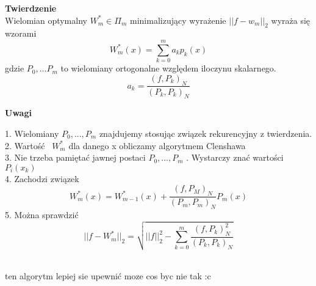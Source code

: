 \documentclass[polish]{kbk}
\begin{document}
\textbf{Twierdzenie} \\
Wielomian optymalny \( W^{*}_m \in \Pi_m \) minimalizujący wyrażenie \( || f - w_m ||_2 \) wyraża się wzorami 
$$ W^{*}_m(x) = \sum_{k=0}^m a_kp_k(x) $$ gdzie
\( P_0, ... P_m \) to wielomiany ortogonalne względem iloczynu skalarnego.
$$ a_k = \frac { (f, P_k)_N }{ (P_k, P_k)_N } $$

\begin{center}
\textbf{Uwagi}
\end{center}

1. Wielomiany \(P_0, ... , P_m\) znajdujemy stosując związek rekurencyjny z twierdzenia.\\
2. Wartość  \( W^{*}_m \) dla danego x obliczamy algorytmem Clenshawa \\
3. Nie trzeba pamiętać jawnej postaci \(P_0, ... , P_m\)  . Wystarczy znać wartości \(P_i(x_k)\)  \\
4. Zachodzi związek
$$ W^{*}_m (x) = W^{*}_{m-1}(x) + \frac{ (f, P_M)_N} {(P_m, P_m)_N} P_m(x) $$
5. Można sprawdzić
$$ || f - W^{*}_m||_2 = \sqrt{ ||f||^2_2 - \sum_{k=0}^m \frac { (f, P_k)^{2}_N} { (P_k, P_k)_N } } $$ ~\cite{znaczek2}

\begin{thebibliography}{99}
 ten algorytm lepiej sie upewnić
 moze cos byc nie tak :c
\end{thebibliography}
\end{document}
